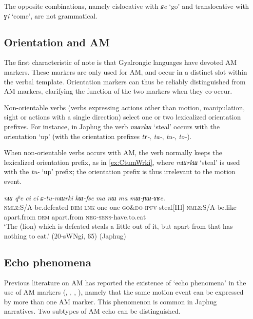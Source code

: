 \documentclass[oneside,a4paper,11pt]{article}
\newcommand{\ipa}[1]{{\phon\textit{#1}}}
\newcommand{\forme}[1]{\textit{\phon#1}}
\newcommand{\japhug}[2]{\textit{\phon#1} `#2'}
\newcommand{\rouge}[1]{{\color{red}#1}}
\begin{document}
The opposite combinations, namely cislocative with \japhug{ɕe}{go} and translocative with \japhug{ɣi}{come}, are not grammatical. 



\subsection{Orientation and AM}
The first characteristic of note is that Gyalrongic languages have devoted AM markers.  These markers are only used for AM, and occur in a distinct slot within the verbal template.  Orientation markers can thus be reliably distinguished from AM markers, clarifying the function of the two markers when they co-occur.


Non-orientable verbs (verbs expressing actions other than motion, manipulation, sight or actions with a single direction) select one or two lexicalized orientation prefixes. For instance, in Japhug the verb \japhug{mɯrkɯ}{steal} occurs with the orientation `up' (with the orientation prefixes \forme{tɤ-}, \forme{ta-}, \forme{tu-}, \forme{to-}). 

When non-orientable verbs occurs with AM, the verb normally keeps the lexicalized orientation prefix, as in \ref{ex:CtumWrki}, where \japhug{mɯrkɯ}{steal} is used with the \forme{tu-} `up' prefix; the orientation prefix is thus irrelevant to the motion event. 

\begin{exe}
\ex \label{ex:CtumWrki}
 \gll \ipa{kɯ-nŋo}	\ipa{nɯ}	\ipa{qʰe}	\ipa{ci}	\ipa{ci}	\ipa{\rouge{ɕ}-tu-mɯrki}	\ipa{kɯ-fse}	\ipa{ma}	\ipa{nɯ}	\ipa{ma}	\ipa{mɯ-ɲɯ-ɤʁe.} \\
\textsc{nmlz}:S/A-be.defeated \textsc{dem} \textsc{lnk} one one \rouge{\textsc{go\&do}}-\textsc{ipfv}-steal[III] \textsc{nmlz}:S/A-be.like apart.from \textsc{dem} apart.from \textsc{neg}-\textsc{sens}-have.to.eat \\
\glt `The (lion) which is defeated steals a little out of it, but apart from that has nothing to eat.' (20-sWNgi, 65) (Japhug)
\end{exe}


\subsection{Echo phenomena} \label{sec:AM.echo}
Previous literature on AM has reported the existence of `echo phenomena' in the use of AM markers (\citealt[251]{wilkins91associated.motion}, \citealt[681-683]{vuillermet12eseejja}, \citealt[128-130]{rose15am}, \citealt[11]{guillaume16am}), namely that the same motion event can be expressed by more than one AM marker. This phenomenon is common in Japhug narratives. Two subtypes of AM echo can be distinguished.
\end{document}
